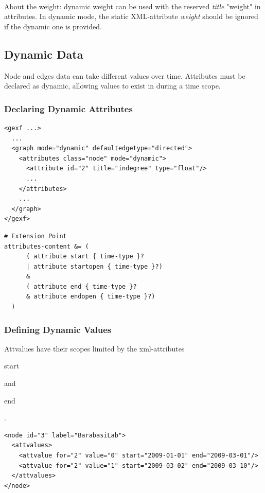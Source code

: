 \documentclass[a4paper,10pt]{article}
\begin{document}
\paragraph{}
About the weight: dynamic weight can be used with the reserved \textit{title} "weight" in attributes. In dynamic mode, the static XML-attribute \textit{weight} should be ignored if the dynamic one is provided.

\subsection{Dynamic Data}

Node and edges data can take different values over time. Attributes must be declared as dynamic, allowing values to exist in during a time scope.

\subsubsection{Declaring Dynamic Attributes}

\lstset{ style=gexf }
\begin{lstlisting}[caption={Indegree may change over time!}]
<gexf ...>
  ...
  <graph mode="dynamic" defaultedgetype="directed">
    <attributes class="node" mode="dynamic">
      <attribute id="2" title="indegree" type="float"/>
      ...
    </attributes>
    ...
  </graph>
</gexf>
\end{lstlisting}

\lstset{ style=rnc }
\begin{lstlisting}[caption={Dynamic Attributes Specification},label=dyndataRNC]
# Extension Point
attributes-content &= (
      ( attribute start { time-type }?
      | attribute startopen { time-type }?)
      &
      ( attribute end { time-type }?
      & attribute endopen { time-type }?)
  )
\end{lstlisting}

\subsubsection{Defining Dynamic Values}

Attvalues have their scopes limited by the xml-attributes \begin{footnotesize}start\end{footnotesize} and \begin{footnotesize}end\end{footnotesize}.

\lstset{ style=gexf }
\begin{lstlisting}[caption={Data value changing over time}]
<node id="3" label="BarabasiLab">
  <attvalues>
    <attvalue for="2" value="0" start="2009-01-01" end="2009-03-01"/>
    <attvalue for="2" value="1" start="2009-03-02" end="2009-03-10"/>
  </attvalues>
</node>
\end{lstlisting}
\end{document}

